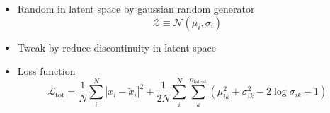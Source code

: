 \begin{itemize}
    \item Random  in latent space by gaussian random generator
    \begin{equation}
        \mathcal{Z} \equiv \mathcal{N}(\mu_i, \sigma_i)
    \end{equation}
    \item Tweak by \textcolor[RGB]{148,0,211}{reduce discontinuity in latent space}
    \item Loss function
    \begin{equation}
        \mathcal{L}_{\text{tot}} = \frac{1}{N}\sum_i^N |x_i-\tilde{x}_i|^2 + \frac{1}{2N}\sum_i^N\sum_k^{n_{\text{latent}}}(\mu_{ik}^2 +\sigma_{ik}^2 - 2\log\sigma_{ik} - 1)
    \end{equation}
\end{itemize}